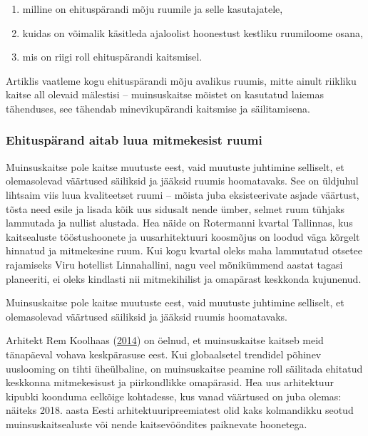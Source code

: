 \documentclass[estonian,]{article}
\providecommand{\tightlist}{%
  \setlength{\itemsep}{0pt}\setlength{\parskip}{0pt}}
\begin{document}
\begin{enumerate}
\def\labelenumi{\arabic{enumi})}
\tightlist
\item
  milline on ehituspärandi mõju ruumile ja selle kasutajatele,
\item
  kuidas on võimalik käsitleda ajaloolist hoonestust kestliku ruumiloome osana,
\item
  mis on riigi roll ehituspärandi kaitsmisel.
\end{enumerate}

Artiklis vaatleme kogu ehituspärandi mõju avalikus ruumis, mitte ainult riikliku kaitse all olevaid mälestisi -- muinsuskaitse mõistet on kasutatud laiemas tähenduses, see tähendab minevikupärandi kaitsmise ja säilitamisena.

\hypertarget{ehituspuxe4rand-aitab-luua-mitmekesist-ruumi}{%
\subsubsection*{Ehituspärand aitab luua mitmekesist ruumi}\label{ehituspuxe4rand-aitab-luua-mitmekesist-ruumi}}

Muinsuskaitse pole kaitse muutuste eest, vaid muutuste juhtimine selliselt, et olemasolevad väärtused säiliksid ja jääksid ruumis hoomatavaks. See on üldjuhul lihtsaim viis luua kvaliteetset ruumi -- mõista juba eksisteerivate asjade väärtust, tõsta need esile ja lisada kõik uus sidusalt nende ümber, selmet ruum tühjaks lammutada ja nullist alustada. Hea näide on Rotermanni kvartal Tallinnas, kus kaitsealuste tööstushoonete ja uusarhitektuuri koosmõjus on loodud väga kõrgelt hinnatud ja mitmekesine ruum. Kui kogu kvartal oleks maha lammutatud otsetee rajamiseks Viru hotellist Linnahallini, nagu veel mõnikümmend aastat tagasi planeeriti, ei oleks kindlasti nii mitmekihilist ja omapärast keskkonda kujunenud.

\begin{blockquote-right}
Muinsuskaitse pole kaitse muutuste eest, vaid muutuste juhtimine
selliselt, et olemasolevad väärtused säiliksid ja jääksid ruumis
hoomatavaks.
\end{blockquote-right}

Arhitekt Rem Koolhaas (\protect\hyperlink{Koolhaas2014}{2014}) on öelnud, et muinsuskaitse kaitseb meid tänapäeval vohava keskpärasuse eest. Kui globaalsetel trendidel põhinev uuslooming on tihti üheülbaline, on muinsuskaitse peamine roll säilitada ehitatud keskkonna mitmekesisust ja piirkondlikke omapärasid. Hea uus arhitektuur kipubki koonduma eelkõige kohtadesse, kus vanad väärtused on juba olemas: näiteks 2018. aasta Eesti arhitektuuripreemiatest olid kaks kolmandikku seotud muinsuskaitsealuste või nende kaitsevööndites paiknevate hoonetega.
\end{document}
